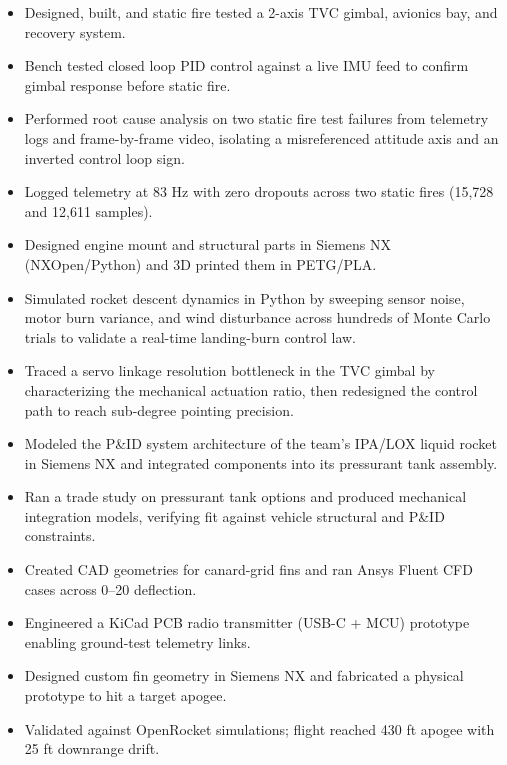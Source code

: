 \begin{itemize}
  \item Designed, built, and static fire tested a 2-axis TVC gimbal, avionics bay, and recovery system.
  \item Bench tested closed loop PID control against a live IMU feed to confirm gimbal response before static fire.
  \item Performed root cause analysis on two static fire test failures from telemetry logs and frame-by-frame video, isolating a misreferenced attitude axis and an inverted control loop sign.
  \item Logged telemetry at 83 Hz with zero dropouts across two static fires (15,728 and 12,611 samples).
  \item Designed engine mount and structural parts in Siemens NX (NXOpen/Python) and 3D printed them in PETG/PLA.
  \item Simulated rocket descent dynamics in Python by sweeping sensor noise, motor burn variance, and wind disturbance across hundreds of Monte Carlo trials to validate a real-time landing-burn control law.
  \item Traced a servo linkage resolution bottleneck in the TVC gimbal by characterizing the mechanical actuation ratio, then redesigned the control path to reach sub-degree pointing precision.
\end{itemize}
\entrygap

\begin{itemize}
  \item Modeled the P\&ID system architecture of the team's IPA/LOX liquid rocket in Siemens NX and integrated components into its pressurant tank assembly.
  \item Ran a trade study on pressurant tank options and produced mechanical integration models, verifying fit against vehicle structural and P\&ID constraints.
  \item Created CAD geometries for canard-grid fins and ran Ansys Fluent CFD cases across 0--20\textdegree{} deflection.
  \item Engineered a KiCad PCB radio transmitter (USB-C + MCU) prototype enabling ground-test telemetry links.
\end{itemize}
\entrygap

\begin{itemize}
  \item Designed custom fin geometry in Siemens NX and fabricated a physical prototype to hit a target apogee.
  \item Validated against OpenRocket simulations; flight reached 430 ft apogee with 25 ft downrange drift.
\end{itemize}
\entrygap

